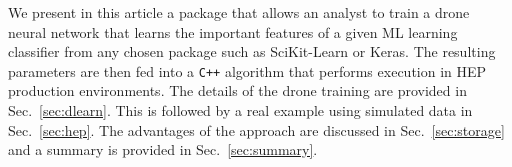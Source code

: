 We present in this article a package that allows an analyst to 
train a drone neural network that learns the important features of a 
given ML learning classifier from any chosen package such as SciKit-Learn or Keras.
The resulting parameters are then fed into a {\tt C++} algorithm that
performs execution in HEP production environments. The details of the
drone training are provided in Sec.~\ref{sec:dlearn}. This is followed
by a real example using simulated data in Sec.~\ref{sec:hep}. The advantages
of the approach are discussed in Sec.~\ref{sec:storage} and a summary is 
provided in Sec.~\ref{sec:summary}.
